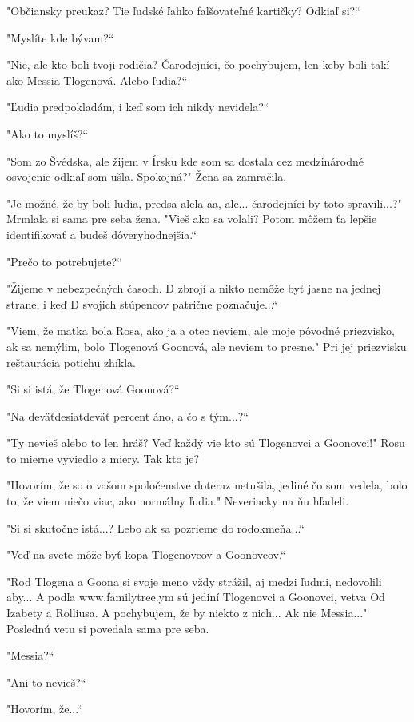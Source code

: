 \documentclass{book}
\begin{document}
"$ $Občiansky preukaz? Tie ľudské ľahko falšovateľné kartičky? Odkiaľ si?“

"$ $Myslíte kde bývam?“

"$ $Nie, ale kto boli tvoji rodičia? Čarodejníci, čo pochybujem, len keby boli takí ako Messia Tlogenová. Alebo ľudia?“

"$ $Ľudia predpokladám, i keď som ich nikdy nevidela?“

"$ $Ako to myslíš?“

"$ $Som zo Švédska, ale žijem v Írsku kde som sa dostala cez medzinárodné osvojenie odkiaľ som ušla. Spokojná?"$ $ Žena sa zamračila.

"$ $Je možné, že by boli ľudia, predsa alela aa, ale... čarodejníci by toto spravili...?"$ $ Mrmlala si sama pre seba žena. "$ $Vieš ako sa volali? Potom môžem ťa lepšie identifikovať a budeš dôveryhodnejšia.“

"$ $Prečo to potrebujete?“

"$ $Žijeme v nebezpečných časoch. D zbrojí a nikto nemôže byť jasne na jednej strane, i keď D svojich stúpencov patrične poznačuje...“

"$ $Viem, že matka bola Rosa, ako ja a otec neviem, ale moje pôvodné priezvisko, ak sa nemýlim, bolo Tlogenová Goonová, ale neviem to presne."$ $ Pri jej priezvisku reštaurácia potichu zhíkla.

"$ $Si si istá, že Tlogenová Goonová?“

"$ $Na deväťdesiatdeväť percent áno, a čo s tým...?“

"$ $Ty nevieš alebo to len hráš? Veď každý vie kto sú Tlogenovci a Goonovci!"$ $ Rosu to mierne vyviedlo z miery. Tak kto je?

"$ $Hovorím, že so o vašom spoločenstve doteraz netušila, jediné čo som vedela, bolo to, že viem niečo viac, ako normálny ľudia."$ $ Neveriacky na ňu hľadeli.

"$ $Si si skutočne istá...? Lebo ak sa pozrieme do rodokmeňa...“

"$ $Veď na svete môže byť kopa Tlogenovcov a Goonovcov.“

"$ $Rod Tlogena a Goona si svoje meno vždy strážil, aj medzi ľuďmi, nedovolili aby... A podľa www.familytree.ym sú jediní Tlogenovci a Goonovci, vetva Od Izabety a Rolliusa. A pochybujem, že by niekto z nich... Ak nie Messia..."$ $ Poslednú vetu si povedala sama pre seba.

"$ $Messia?“

"$ $Ani to nevieš?“

"$ $Hovorím, že...“
\end{document}
